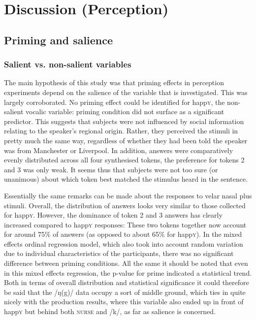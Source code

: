 	\chapter{Discussion (Perception)}
	\label{ch.perc_disc}

	\section{Priming and salience}
		\label{sec.perc_res.disc.salience}

		\subsection{Salient vs. non-salient variables}
		
The main hypothesis of this study was that priming effects in perception experiments depend on the salience of the variable that is investigated.
This was largely corroborated.
No priming effect could be identified for happ\textsc{y}, the non-salient vocalic variable: priming condition did not surface as a significant predictor.
This suggests that subjects were not influenced by social information relating to the speaker's regional origin.
Rather, they perceived the stimuli in pretty much the same way, regardless of whether they had been told the speaker was from Manchester or Liverpool.
In addition, answers were comparatively evenly distributed across all four synthesised tokens, the preference for tokens 2 and 3 was only weak.
It seems thus that subjects were not too sure (or unanimous) about which token best matched the stimulus heard in the sentence.

Essentially the same remarks can be made about the responses to velar nasal plus stimuli.
Overall, the distribution of answers looks very similar to those collected for happ\textsc{y}.
However, the dominance of token 2 and 3 answers has clearly increased compared to happ\textsc{y} responses: These two tokens together now account for around 75\% of answers (as opposed to about 65\% for happ\textsc{y}).
In the mixed effects ordinal regression model, which also took into account random variation due to individual characteristics of the participants, there was no significant difference between priming conditions.
All the same it should be noted that even in this mixed effects regression, the p-value for prime indicated a statistical trend.
Both in terms of overall distribution and statistical significance it could therefore be said that the /ŋ(g)/ data occupy a sort of middle ground, which ties in quite nicely with the production results, where this variable also ended up in front of happ\textsc{y} but behind both \textsc{nurse} and /k/, as far as salience is concerned.

